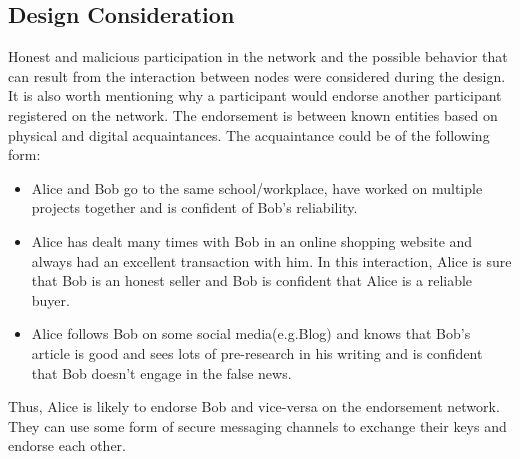 %

\subsection{Design Consideration}
Honest and malicious participation in the network and the possible behavior
that can result from the interaction between nodes were considered during the
design. It is also worth mentioning why a participant would endorse another
participant registered on the network. The endorsement is between known
entities based on physical and digital acquaintances. 
The acquaintance could be of the following form:
\begin{itemize}
	\item Alice and Bob go to the same school/workplace, have worked on
		multiple projects together and is confident of Bob's reliability.
	\item Alice has dealt many times with Bob in an online shopping website and
		always had an excellent transaction with him. In this interaction,
		Alice is sure that Bob is an honest seller and Bob is confident that
		Alice is a reliable buyer. 
	\item Alice follows Bob on some social media(e.g.Blog) and knows that Bob's
		article is good and sees lots of pre-research in his writing and is
		confident that Bob doesn't engage in the false news.
\end{itemize}
Thus, Alice is likely to endorse Bob and vice-versa on the endorsement network.
They can use some form of secure messaging channels to exchange their keys and
endorse each other. \\

